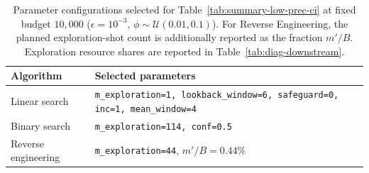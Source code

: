 \begin{table}[ht]
\centering
\caption{Parameter configurations selected for Table~\ref{tab:summary-low-prec-ci} at fixed budget $10{,}000$ ($\epsilon=10^{-3}$, $\phi\sim\mathcal{U}(0.01,0.1)$). For Reverse Engineering, the planned exploration-shot count is additionally reported as the fraction $m'/B$. Exploration resource shares are reported in Table~\ref{tab:diag-downstream}.}
\label{tab:opt-param-first-tab}
\begin{tabular}{ll}
\toprule
Algorithm
& Selected parameters \\
\midrule
Linear search
& \texttt{m\_exploration=1, lookback\_window=6, safeguard=0, inc=1, mean\_window=4} \\
Binary search
& \texttt{m\_exploration=114, conf=0.5} \\
Reverse engineering
& \texttt{m\_exploration=44}, $m'/B=0.44\%$ \\
\bottomrule
\end{tabular}
\end{table}
